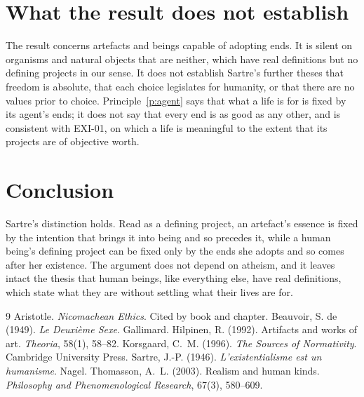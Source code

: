 \documentclass{situationist-preprint}
\begin{document}
\section{What the result does not establish}

The result concerns artefacts and beings capable of adopting ends. It is silent on organisms and natural objects that are neither, which have real definitions but no defining projects in our sense. It does not establish Sartre's further theses that freedom is absolute, that each choice legislates for humanity, or that there are no values prior to choice. Principle~\ref{p:agent} says that what a life is for is fixed by its agent's ends; it does not say that every end is as good as any other, and is consistent with EXI-01, on which a life is meaningful to the extent that its projects are of objective worth.

\section{Conclusion}

Sartre's distinction holds. Read as a defining project, an artefact's essence is fixed by the intention that brings it into being and so precedes it, while a human being's defining project can be fixed only by the ends she adopts and so comes after her existence. The argument does not depend on atheism, and it leaves intact the thesis that human beings, like everything else, have real definitions, which state what they are without settling what their lives are for.

\begin{thebibliography}{9}\small
{} Aristotle. \emph{Nicomachean Ethics}. Cited by book and chapter.
 Beauvoir, S. de (1949). \emph{Le Deuxi\`eme Sexe}. Gallimard.
 Hilpinen, R. (1992). Artifacts and works of art. \emph{Theoria}, 58(1), 58--82.
 Korsgaard, C.~M. (1996). \emph{The Sources of Normativity}. Cambridge University Press.
 Sartre, J.-P. (1946). \emph{L'existentialisme est un humanisme}. Nagel.
 Thomasson, A.~L. (2003). Realism and human kinds. \emph{Philosophy and Phenomenological Research}, 67(3), 580--609.
\end{thebibliography}
\end{document}
